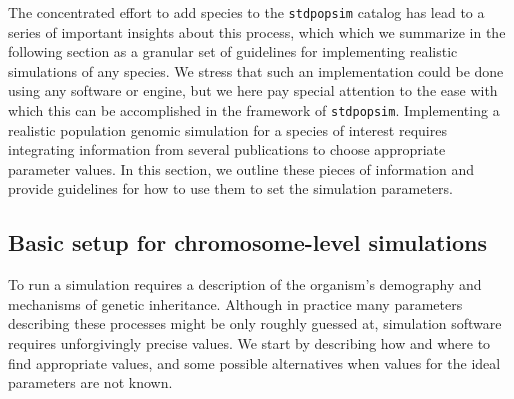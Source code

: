 \documentclass[hidelinks]{article}
\newcommand{\stdpopsim}{\texttt{stdpopsim}\xspace}
\begin{document}
The concentrated effort to add species to the \stdpopsim catalog
has lead to a series of important insights about this process,
which which we summarize in the following section as a granular set of guidelines
for implementing realistic simulations of any species. We stress that such
an implementation could be done using any software or engine, but we
here pay special attention to the ease with which this can be accomplished
in the framework of \stdpopsim.
Implementing a realistic population genomic simulation for a species of interest
requires integrating information from several publications to choose appropriate parameter values. 
In this section, we outline these pieces of information and
provide guidelines for how to use them to set the simulation parameters.


\subsection*{Basic setup for chromosome-level simulations}


To run a simulation requires a description of the organism's demography and mechanisms of genetic inheritance.
Although in practice many parameters describing these processes might be only roughly guessed at,
simulation software requires unforgivingly precise values.
We start by describing how and where to find appropriate values, and some possible
alternatives when values for the ideal parameters are not known.
\end{document}
